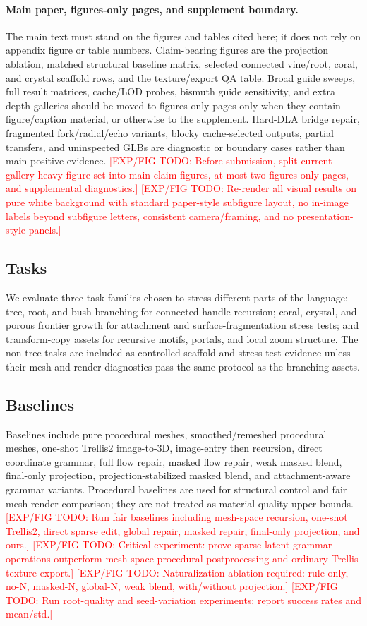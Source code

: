 \documentclass[sigconf,anonymous,review]{acmart}
\providecommand{\ExpFigTODO}[1]{\textcolor{red}{[EXP/FIG TODO: #1]}}
\begin{document}
\paragraph{Main paper, figures-only pages, and supplement boundary.}
The main text must stand on the figures and tables cited here; it does not rely on appendix figure or table numbers. Claim-bearing figures are the projection ablation, matched structural baseline matrix, selected connected vine/root, coral, and crystal scaffold rows, and the texture/export QA table. Broad guide sweeps, full result matrices, cache/LOD probes, bismuth guide sensitivity, and extra depth galleries should be moved to figures-only pages only when they contain figure/caption material, or otherwise to the supplement. Hard-DLA bridge repair, fragmented fork/radial/echo variants, blocky cache-selected outputs, partial transfers, and uninspected GLBs are diagnostic or boundary cases rather than main positive evidence. \ExpFigTODO{Before submission, split current gallery-heavy figure set into main claim figures, at most two figures-only pages, and supplemental diagnostics.}
\ExpFigTODO{Re-render all visual results on pure white background with standard paper-style subfigure layout, no in-image labels beyond subfigure letters, consistent camera/framing, and no presentation-style panels.}

\subsection{Tasks}
We evaluate three task families chosen to stress different parts of the language: tree, root, and bush branching for connected handle recursion; coral, crystal, and porous frontier growth for attachment and surface-fragmentation stress tests; and transform-copy assets for recursive motifs, portals, and local zoom structure. The non-tree tasks are included as controlled scaffold and stress-test evidence unless their mesh and render diagnostics pass the same protocol as the branching assets.

\subsection{Baselines}
Baselines include pure procedural meshes, smoothed/remeshed procedural meshes, one-shot Trellis2 image-to-3D, image-entry then recursion, direct coordinate grammar, full flow repair, masked flow repair, weak masked blend, final-only projection, projection-stabilized masked blend, and attachment-aware grammar variants. Procedural baselines are used for structural control and fair mesh-render comparison; they are not treated as material-quality upper bounds.
\ExpFigTODO{Run fair baselines including mesh-space recursion, one-shot Trellis2, direct sparse edit, global repair, masked repair, final-only projection, and ours.}
\ExpFigTODO{Critical experiment: prove sparse-latent grammar operations outperform mesh-space procedural postprocessing and ordinary Trellis texture export.}
\ExpFigTODO{Naturalization ablation required: rule-only, no-N, masked-N, global-N, weak blend, with/without projection.}
\ExpFigTODO{Run root-quality and seed-variation experiments; report success rates and mean/std.}
\end{document}
